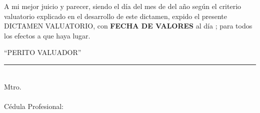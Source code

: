 
A mi mejor juicio y parecer, siendo
\textcolor{principal}
{el día \diaInforme del mes de \mesInforme del a\~no \annoInforme} 
seg\'un el criterio valuatorio explicado en el desarrollo de este dictamen, 
expido el presente \textcolor{principal}{DICTAMEN VALUATORIO}, 
con \textcolor{principal}{\textbf{FECHA DE VALORES}} al d\'ia 
\textcolor{principal}{\textbf{\fechaValores}}; para todos 
los efectos a que haya lugar.\\

\begin{center}
	``PERITO VALUADOR''\\[1cm]
	\rule{7cm}{.4pt}\\
	Mtro. \peritoValuador \\ 
	\textcolor{principal}{\descripcionFirmaPerito} \\ 
	Cédula Profesional: \textcolor{principal}{\cedulaProfesional}
\end{center}
